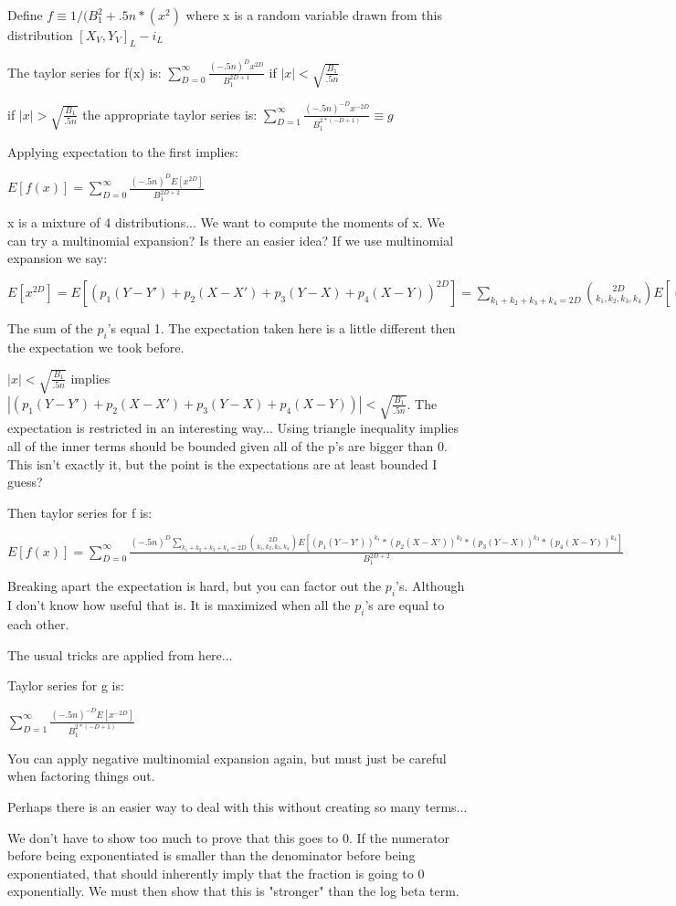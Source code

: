 \documentclass[11pt]{article}
\begin{document}
Define $f \equiv 1 / (B_1^2 + .5n*(x^2)$ where x is a random variable drawn from this distribution $[X_V,Y_V]_{L} - i_L$

The taylor series for f(x) is: $\sum_{D=0}^\infty \frac{(-.5n)^{D}x^{2D}}{B_1^{2D+1}}$ if $|x| < \sqrt{\frac{B_1}{.5n}} $

if $|x| > \sqrt{\frac{B_1}{.5n}}$ the appropriate taylor series is: $\sum_{D=1}^\infty \frac{(-.5n)^{-D}x^{-2D}}{B_1^{2*(-D+1)}} \equiv g$ 

Applying expectation to the first implies: 

$E[f(x)] = \sum_{D=0}^\infty \frac{(-.5n)^D E[x^{2D}]}{B_1^{2D+2}}$

x is a mixture of 4 distributions... We want to compute the moments of x. We can try a multinomial expansion? Is there an easier idea? If we use multinomial expansion we say: 

$E[x^{2D}] = E[(p_1(Y-Y') + p_2(X-X')+ p_3(Y-X) +p_4 (X-Y))^{2D}] = \sum_{k_1 + k_2 + k_3 + k_4=2D} \binom{2D}{k_1,k_2,k_3,k_4} E[(p_1(Y-Y'))^{k_1}*(p_2(X-X'))^{k_2}*(p_3(Y-X))^{k_3}*(p_4(X-Y))^{k_4}]$

The sum of the $p_i$'s equal 1. The expectation taken here is a little different then the expectation we took before.

$|x| < \sqrt{\frac{B_1}{.5n}} $ implies $ |(p_1(Y-Y') + p_2(X-X')+ p_3(Y-X) +p_4 (X-Y))| < \sqrt{\frac{B_1}{.5n}} $. The expectation is restricted in an interesting way... Using triangle inequality implies all of the inner terms should be bounded given all of the p's are bigger than 0. This isn't exactly it, but the point is the expectations are at least bounded I guess?

Then taylor series for f is:

$E[f(x)] = \sum_{D=0}^\infty \frac{(-.5n)^D \sum_{k_1 + k_2 + k_3 + k_4=2D} \binom{2D}{k_1,k_2,k_3,k_4} E[(p_1(Y-Y'))^{k_1}*(p_2(X-X'))^{k_2}*(p_3(Y-X))^{k_3}*(p_4(X-Y))^{k_4}]}{B_1^{2D+2}}$

Breaking apart the expectation is hard, but you can factor out the $p_i$'s. Although I don't know how useful that is. It is maximized when all the $p_i$'s are equal to each other.

The usual tricks are applied from here...

Taylor series for g is:

$\sum_{D=1}^\infty \frac{(-.5n)^{-D}E[x^{-2D}]}{B_1^{2*(-D+1)}}$

You can apply negative multinomial expansion again, but must just be careful when factoring things out.

Perhaps there is an easier way to deal with this without creating so many terms... 

We don't have to show too much to prove that this goes to 0. If the numerator before being exponentiated is smaller than the denominator before being exponentiated, that should inherently imply that the fraction is going to 0 exponentially. We must then show that this is "stronger" than the log beta term.
\end{document}
